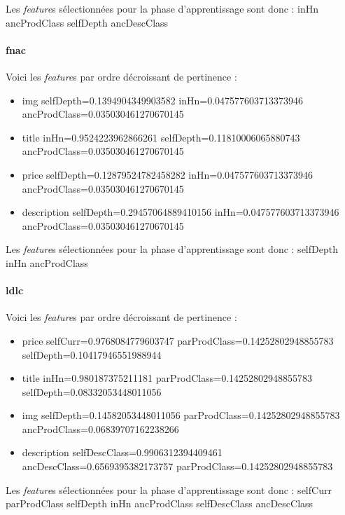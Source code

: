 \documentclass{article}
\begin{document}
Les \emph{feature}s sélectionnées pour la phase d'apprentissage sont donc :
inHn ancProdClass selfDepth ancDescClass

\paragraph{fnac}
Voici les \emph{feature}s par ordre décroissant de pertinence :
\begin{itemize}
    \item{img} selfDepth=0.1394904349903582 inHn=0.047577603713373946 ancProdClass=0.035030461270670145
    \item{title} inHn=0.9524223962866261 selfDepth=0.11810006065880743 ancProdClass=0.035030461270670145
    \item{price} selfDepth=0.12879524782458282 inHn=0.047577603713373946 ancProdClass=0.035030461270670145
    \item{description} selfDepth=0.29457064889410156 inHn=0.047577603713373946 ancProdClass=0.035030461270670145
\end{itemize}

Les \emph{feature}s sélectionnées pour la phase d'apprentissage sont donc :
selfDepth inHn ancProdClass

\paragraph{ldlc}
Voici les \emph{feature}s par ordre décroissant de pertinence :
\begin{itemize}
    \item{price} selfCurr=0.9768084779603747 parProdClass=0.14252802948855783 selfDepth=0.10417946551988944
    \item{title} inHn=0.980187375211181 parProdClass=0.14252802948855783 selfDepth=0.08332053448011056
    \item{img} selfDepth=0.14582053448011056 parProdClass=0.14252802948855783 ancProdClass=0.06839707162238266
    \item{description} selfDescClass=0.9906312394409461 ancDescClass=0.6569395382173757 parProdClass=0.14252802948855783
\end{itemize}

Les \emph{feature}s sélectionnées pour la phase d'apprentissage sont donc :
selfCurr parProdClass selfDepth inHn ancProdClass selfDescClass ancDescClass
\end{document}
